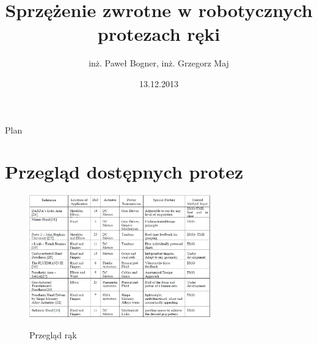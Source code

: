 \documentclass[8pt]{beamer}
\title[Robotyczne protezy ręki, BeBionic]{Sprzężenie zwrotne w robotycznych protezach ręki}
\date[2013]{13.12.2013}
\author[inż. Paweł Bogner, inż. Grzegorz Maj]{inż. Paweł Bogner, inż. Grzegorz Maj}
\institute[PWr]{Politechnika Wrocławska}
\begin{document}
{
\frame{\maketitle}
}

\begin{frame}{Plan}
\begin{multicols}{2}
	\tableofcontents
	\end{multicols}
\end{frame}

\section{Przegląd dostępnych protez}

\begin{frame}%
	\begin{center}
		\begin{figure}
			\includegraphics[width=0.7\textwidth]{graphics/hands.jpg}
			\label{graph:hand}	
			\caption{Przegląd rąk \cite{bandara2012upper}}
		\end{figure}
	\end{center}

\end{frame}
\end{document}
